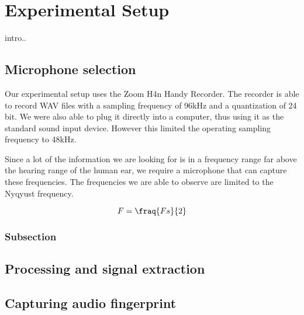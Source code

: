 \chapter{Experimental Setup}
\label{chp:experimental_setup} 

intro..

\section{Microphone selection}\label{sec:microphone_selection}

Our experimental setup uses the Zoom H4n Handy Recorder. 
The recorder is able to record WAV files with a sampling frequency of 96kHz and a quantization of 24 bit. We were also able to plug it directly into a computer, thus using it as the standard sound input device. 
However this limited the operating sampling frequency to 48kHz.

Since a lot of the information we are looking for is in a frequency range far above the hearing range of the human ear, we require a microphone that can capture these frequencies. 
The frequencies we are able to observe are limited to the Nyqyust frequency.

\begin{equation}\label{Nyquist frequency}
F = \fraq{Fs}{2}
\end{equation}

\subsection{Subsection}\label{sec:first_ssection}


\section{Processing and signal extraction}\label{sec:processing_signal_extraction}


\section{Capturing audio fingerprint}\label{sec:capturing_audio_fingerprint}
